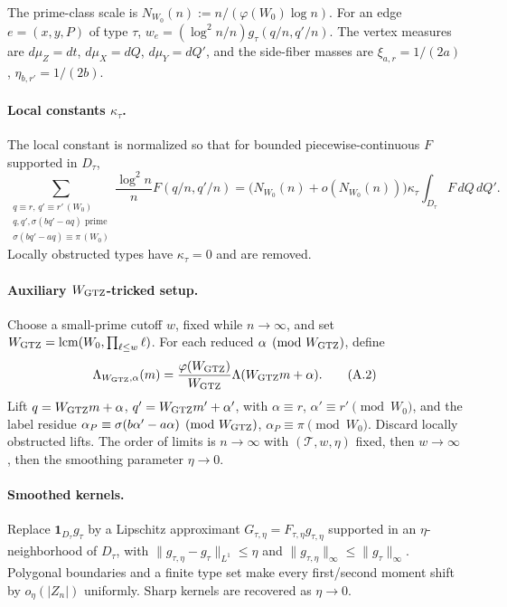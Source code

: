 \documentclass[11pt]{article}
\begin{document}
The prime-class scale is
\(N_{W_0}(n):=n/(\varphi(W_0)\log n)\).
For an edge \(e=(x,y,P)\) of type \(\tau\),
\(w_e=(\log^2 n/n)g_\tau(q/n,q'/n)\).  The vertex measures are
\(d\mu_Z=dt\), \(d\mu_X=dQ\), \(d\mu_Y=dQ'\), and the side-fiber masses are
\(\xi_{a,r}=1/(2a)\), \(\eta_{b,r'}=1/(2b)\).

\paragraph{Local constants \(\kappa_\tau\).}
The local constant is normalized so that for bounded piecewise-continuous
\(F\) supported in \(D_\tau\),
\[
  \sum_{\substack{q\equiv r,\,q'\equiv r'\,(W_0)\\ q,q',\sigma(bq'-aq)\text{ prime}\\
                   \sigma(bq'-aq)\equiv\pi\,(W_0)}}
  \frac{\log^2 n}{n}F(q/n,q'/n)
  =
  \bigl(N_{W_0}(n)+o(N_{W_0}(n))\bigr)
  \kappa_\tau\int_{D_\tau}F\,dQ\,dQ'.
  \tag{A.1}
\]
Locally obstructed types have \(\kappa_\tau=0\) and are removed.

\paragraph{Auxiliary \(W_{\rm GTZ}\)-tricked setup.}
Choose a small-prime cutoff \(w\), fixed while \(n\to\infty\), and set
\(W_{\rm GTZ}=\operatorname{lcm}(W_0,\prod_{\ell\le w}\ell)\).  For each
reduced \(\alpha\pmod{W_{\rm GTZ}}\), define
\[
  \Lambda_{W_{\rm GTZ},\alpha}(m)
  =\frac{\varphi(W_{\rm GTZ})}{W_{\rm GTZ}}\Lambda(W_{\rm GTZ}m+\alpha).
  \tag{A.2}
\]
Lift \(q=W_{\rm GTZ}m+\alpha\), \(q'=W_{\rm GTZ}m'+\alpha'\), with
\(\alpha\equiv r\), \(\alpha'\equiv r'\pmod{W_0}\), and the label residue
\(\alpha_P\equiv\sigma(b\alpha'-a\alpha)\pmod{W_{\rm GTZ}}\),
\(\alpha_P\equiv\pi\pmod{W_0}\).  Discard locally obstructed lifts.  The order
of limits is \(n\to\infty\) with \((\mathcal T,w,\eta)\) fixed, then
\(w\to\infty\), then the smoothing parameter \(\eta\to0\).

\paragraph{Smoothed kernels.}
Replace \(\mathbf 1_{D_\tau}g_\tau\) by a Lipschitz approximant
\(G_{\tau,\eta}=F_{\tau,\eta}g_{\tau,\eta}\) supported in an
\(\eta\)-neighborhood of \(D_\tau\), with
\(\|g_{\tau,\eta}-g_\tau\|_{L^1}\le\eta\) and
\(\|g_{\tau,\eta}\|_\infty\le\|g_\tau\|_\infty\).  Polygonal boundaries and a
finite type set make every first/second moment shift by \(o_\eta(|Z_n|)\)
uniformly.  Sharp kernels are recovered as \(\eta\to0\).
\end{document}
